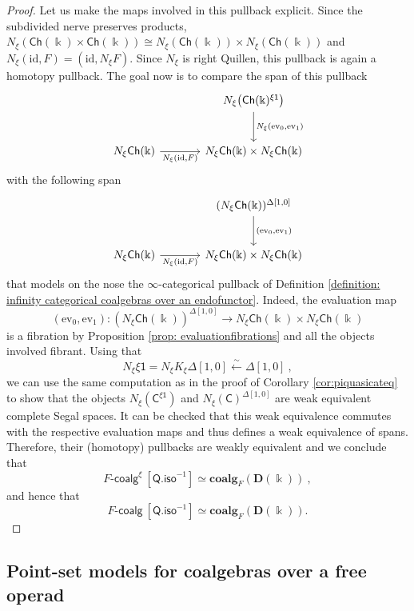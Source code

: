 \documentclass[a4paper,12pt]{amsart}
\theoremstyle{plain}
\theoremstyle{definition}
\theoremstyle{remark}
\newcommand{\kk}{\Bbbk}
\begin{document}
\begin{proof}
Let us make the maps involved in this pullback explicit. Since the subdivided nerve preserves products, $N_{\xi}(\mathsf{Ch}(\kk)\times\mathsf{Ch}(\kk)) \cong N_{\xi}(\mathsf{Ch}(\kk)) \times N_{\xi}(\mathsf{Ch}(\kk))$ and $N_{\xi}(\mathrm{id},F)=(\mathrm{id},N_{\xi}F)$. Since $N_\xi$ is right Quillen, this pullback is again a homotopy pullback. The goal now is to compare the span of this pullback 
\[
\begin{tikzcd}[row sep=large, column sep=large]
& N_{\xi}\bigl(\mathsf{Ch}(\kk)^{\xi\mathsf{1}}\bigr) 
    \arrow[d, "{N_{\xi}(\mathrm{ev}_0,\mathrm{ev}_1)}"] \\
N_{\xi}\mathsf{Ch}(\kk) 
    \arrow[r, "{N_{\xi}(\mathrm{id},F)}"'] 
& N_{\xi}\mathsf{Ch}(\kk)\times N_{\xi}\mathsf{Ch}(\kk)
\end{tikzcd}
\]
with the following span 
\[
\begin{tikzcd}[row sep=large, column sep=large]
& (N_{\xi}\mathsf{Ch}(\kk))^{\Delta[1,0]} 
    \arrow[d, "{(\mathrm{ev}_0,\mathrm{ev}_1)}"] \\
N_{\xi}\mathsf{Ch}(\kk) 
    \arrow[r, "{N_{\xi}(\mathrm{id},F)}"'] 
& N_{\xi}\mathsf{Ch}(\kk)\times N_{\xi}\mathsf{Ch}(\kk)
\end{tikzcd}
\]
that models on the nose the $\infty$-categorical pullback of Definition \ref{definition: infinity categorical coalgebras over an endofunctor}. Indeed, the evaluation map
\[
(\mathrm{ev}_0,\mathrm{ev}_1): (N_{\xi}\mathsf{Ch}(\kk))^{\Delta[1,0]}\longrightarrow N_{\xi}\mathsf{Ch}(\kk)\times N_{\xi}\mathsf{Ch}(\kk)
\]
is a fibration by Proposition \ref{prop: evaluationfibrations} and all the objects involved fibrant. Using that 
\[
N_{\xi}\xi\mathsf{1}=N_{\xi}K_{\xi}\Delta[1,0]\stackrel{\sim}{\leftarrow}\Delta[1,0]~, 
\]
we can use the same computation as in the proof of Corollary \ref{cor:piquasicateq} to show that the objects $N_{\xi}(\mathsf{C}^{\xi\mathsf{1}})$ and $N_{\xi}(\mathsf{C})^{\Delta[1,0]}$ are weak equivalent complete Segal spaces. It can be checked that this weak equivalence commutes with the respective evaluation maps and thus defines a weak equivalence of spans. Therefore, their (homotopy) pullbacks are weakly equivalent and we conclude that 
\[
F\text{-}\mathsf{coalg}^{\xi}~[\mathsf{Q.iso}^{-1}] \simeq \mathbf{coalg}_{F}(\mathbf{D}(\kk))~,
\]
and hence that 
\[
F\text{-}\mathsf{coalg}~[\mathsf{Q.iso}^{-1}] \simeq \mathbf{coalg}_{F}(\mathbf{D}(\kk)).
\]
\end{proof}

\subsection{Point-set models for coalgebras over a free operad}
\end{document}
